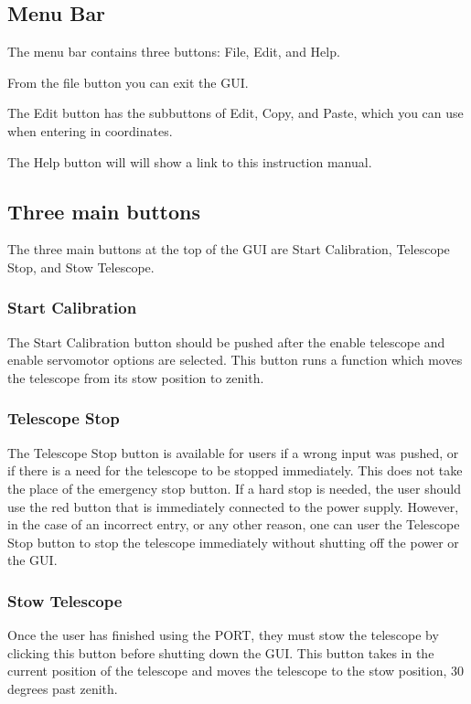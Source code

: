 \documentclass{article}
\begin{document}
\subsection{Menu Bar}

The menu bar contains three buttons: File, Edit, and Help.

From the file button you can exit the GUI.

The Edit button has the subbuttons of Edit, Copy, and Paste, which you can use when entering in coordinates.

The Help button will will show a link to this instruction manual.

\subsection{Three main buttons}

The three main buttons at the top of the GUI are Start Calibration, Telescope Stop, and Stow Telescope.

\subsubsection{Start Calibration}

The Start Calibration button should be pushed after the enable telescope and enable servomotor options are selected. This button runs a function which moves the telescope from its stow position to zenith.

\subsubsection{Telescope Stop}

The Telescope Stop button is available for users if a wrong input was pushed, or if there is a need for the telescope to be stopped immediately. This does not take the place of the emergency stop button. If a hard stop is needed, the user should use the red button that is immediately connected to the power supply. However, in the case of an incorrect entry, or any other reason, one can user the Telescope Stop button to stop the telescope immediately without shutting off the power or the GUI.

\subsubsection{Stow Telescope}

Once the user has finished using the PORT, they must stow the telescope by clicking this button before shutting down the GUI. This button takes in the current position of the telescope and moves the telescope to the stow position, 30 degrees past zenith. 
\end{document}
